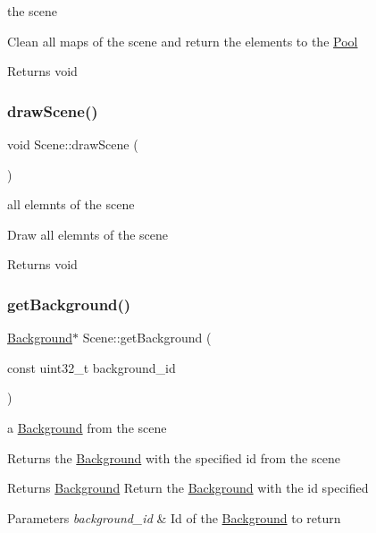 the scene

Clean all maps of the scene and return the elements to the \hyperlink{class_pool}{Pool}

\begin{DoxyReturn}{Returns}
void 
\end{DoxyReturn}
\mbox{\label{class_scene_ae27f4327ca363cc9cad8ab553504e2d5}} 
\subsubsection{\texorpdfstring{draw\+Scene()}{drawScene()}}
{\footnotesize\ttfamily void Scene\+::draw\+Scene (\begin{DoxyParamCaption}{ }\end{DoxyParamCaption})}

all elemnts of the scene

Draw all elemnts of the scene

\begin{DoxyReturn}{Returns}
void 
\end{DoxyReturn}
\mbox{\label{class_scene_ade83d8b5c8b13f12b11c9ef07507163d}} 
\subsubsection{\texorpdfstring{get\+Background()}{getBackground()}}
{\footnotesize\ttfamily \hyperlink{class_background}{Background}$\ast$ Scene\+::get\+Background (\begin{DoxyParamCaption}\item[{const uint32\+\_\+t}]{background\+\_\+id }\end{DoxyParamCaption})}

a \hyperlink{class_background}{Background} from the scene

Returns the \hyperlink{class_background}{Background} with the specified id from the scene

\begin{DoxyReturn}{Returns}
\hyperlink{class_background}{Background} Return the \hyperlink{class_background}{Background} with the id specified 
\end{DoxyReturn}

\begin{DoxyParams}{Parameters}
{\em background\+\_\+id} & Id of the \hyperlink{class_background}{Background} to return \\
\hline
\end{DoxyParams}
\mbox{\label{class_scene_a53baaa91f1356e5fe9abc9b5a1cffb94}} 
